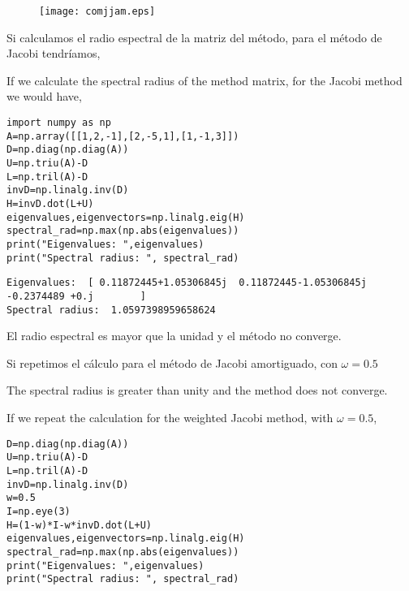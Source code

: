 \begin{figure}[h]
\centering
\texttt{[image: comjjam.eps]}
\label{fig:cjjam}


\end{figure}

\begin{paracol}{2}
Si calculamos el radio espectral de la matriz del método, para el método de Jacobi tendríamos,

\switchcolumn

If we calculate the spectral radius of the method matrix, for the Jacobi method we would have,

\end{paracol}

\begin{verbatim}
import numpy as np
A=np.array([[1,2,-1],[2,-5,1],[1,-1,3]])
D=np.diag(np.diag(A))
U=np.triu(A)-D
L=np.tril(A)-D
invD=np.linalg.inv(D)
H=invD.dot(L+U)
eigenvalues,eigenvectors=np.linalg.eig(H)
spectral_rad=np.max(np.abs(eigenvalues))
print("Eigenvalues: ",eigenvalues)
print("Spectral radius: ", spectral_rad)
\end{verbatim}

\begin{verbatim}
Eigenvalues:  [ 0.11872445+1.05306845j  0.11872445-1.05306845j -0.2374489 +0.j        ]
Spectral radius:  1.0597398959658624
\end{verbatim}

\begin{paracol}{2}
El radio espectral es mayor que la unidad y el método no converge.

Si repetimos el cálculo para el método de Jacobi amortiguado, con $\omega=0.5$

\switchcolumn
The spectral radius is greater than unity and the method does not converge.

If we repeat the calculation for the weighted Jacobi method, with $\omega=0.5$,
\end{paracol}

\begin{verbatim}
D=np.diag(np.diag(A))
U=np.triu(A)-D
L=np.tril(A)-D
invD=np.linalg.inv(D)
w=0.5
I=np.eye(3)
H=(1-w)*I-w*invD.dot(L+U)
eigenvalues,eigenvectors=np.linalg.eig(H)
spectral_rad=np.max(np.abs(eigenvalues))
print("Eigenvalues: ",eigenvalues)
print("Spectral radius: ", spectral_rad)

\end{verbatim}

